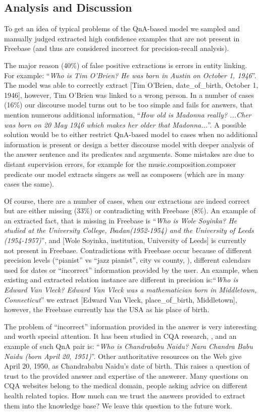 \subsection{Analysis and Discussion}
\label{section:factoid:cqarelextract:analysis}

To get an idea of typical problems of the QnA-based model we sampled and manually judged extracted high confidence examples that are not present in Freebase (and thus are considered incorrect for precision-recall analysis).

The major reason (40\%) of false positive extractions is errors in entity linking.
For example: ``\textit{Who is Tim O'Brien? He was born in Austin on October 1, 1946}''.
The model was able to correctly extract [Tim O'Brien, date\_of\_birth, October 1, 1946], however, Tim O'Brien was linked to a wrong person.
In a number of cases (16\%) our discourse model turns out to be too simple and fails for answers, that mention numerous additional information, \eg ``\textit{How old is Madonna really? ...Cher was born on 20 May 1946 which makes her older that Madonna...}''.
A possible solution would be to either restrict QnA-based model to cases when no additional information is present or design a better discourse model with deeper analysis of the answer sentence and its predicates and arguments.
Some mistakes are due to distant supervision errors, for example for the music.composition.composer predicate our model extracts singers as well as composers (which are in many cases the same).

Of course, there are a number of cases, when our extractions are indeed correct but are either missing (33\%) or contradicting with Freebase (8\%).
An example of an extracted fact, that is missing in Freebase is ``\textit{Who is Wole Soyinka? He studied at the University College, Ibadan(1952-1954) and the University of Leeds (1954-1957)}'', and [Wole Soyinka, institution, University of Leeds] is currently not present in Freebase.
Contradictions with Freebase occur because of different precision levels (``pianist'' vs ``jazz pianist'', city vs county, \etc), different calendars used for dates or ``incorrect'' information provided by the user.
An example, when existing and extracted relation instance are different in precision is:``\textit{Who is Edward Van Vleck? Edward Van Vleck was a mathematician born in Middletown, Connecticut}'' we extract [Edward Van Vleck, place\_of\_birth, Middletown], however, the Freebase currently has the USA as his place of birth.

The problem of ``incorrect'' information provided in the answer is very interesting and worth special attention.
It has been studied in CQA research, \eg \cite{shah2010evaluating}, and an example of such QnA pair is: ``\textit{Who is Chandrababu Naidu? Nara Chandra Babu Naidu (born April 20, 1951)}''.
Other authoritative resources on the Web give April 20, 1950, as Chandrababu Naidu's date of birth.
This raises a question of trust to the provided answer and expertise of the answerer.
Many questions on CQA websites belong to the medical domain, \eg people asking advice on different health related topics.
How much can we trust the answers provided to extract them into the knowledge base?
We leave this question to the future work.

